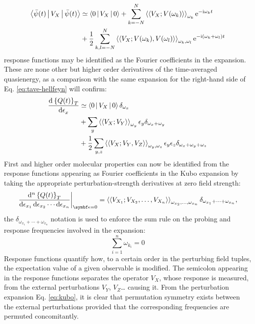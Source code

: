 \begin{equation}
\begin{aligned}
 \Braket{\bar{\psi}(t) | V_X | \bar{\psi}(t)} &\simeq
 \Braket{0|V_X|0} +\sum_{k=-N}^N
 \Braket{\Braket{V_X; V(\omega_k)}}_{\omega_k}\mathrm{e}^{-\mathrm{i}\omega_k t} \\
 &+\frac{1}{2}\sum_{k,l=-N}^N
 \Braket{\Braket{V_X; V(\omega_k),V(\omega_l)}}_{\omega_k,\omega_l}\mathrm{e}^{-\mathrm{i}(\omega_k+\omega_l)t}
\end{aligned}
\end{equation}
response functions may be identified as the Fourier coefficients in the
expansion. These are none other but higher order derivatives of the
time-averaged quasienergy, as a comparison with the same expansion for
the right-hand side of Eq. \eqref{eq:tave-hellfeyn} will confirm:
\begin{equation}\label{eq:kubo}
\begin{aligned}
  \frac{\mathop{}\!\mathrm{d}^{}\left\lbrace Q(t)\right\rbrace_T}{\mathop{}\!\mathrm{d} \epsilon_x^{}}
  &\simeq \Braket{0|V_X|0}\delta_{\omega_x} \\
  &+\sum_{y}\Braket{\Braket{V_X; V_Y}}_{\omega_y}\epsilon_y\delta_{\omega_x+\omega_y} \\
  &+\frac{1}{2}\sum_{y,z}\Braket{\Braket{V_X; V_Y,V_Z}}_{\omega_y,\omega_z}\epsilon_y\epsilon_z\delta_{\omega_x+\omega_y+\omega_z}
\end{aligned}
\end{equation}
First and higher order molecular properties can now be identified from
the response functions appearing as Fourier coefficients in the Kubo
expansion by taking the appropriate perturbation-strength derivatives at
zero field strength:
\begin{equation}\label{eq:nth-order-derivative}
  \left.\frac{\diff^n \aveQ}{\diff\epsilon_{x_1}\diff\epsilon_{x_2}\cdots\diff\epsilon_{x_n}} \right|_{\vect{\epsilon}=0}
  =
  \response{V_{X_1}}{V_{X_2}, \ldots, V_{X_n}}{\omega_{x_2},\ldots,\omega_{x_n}}\delta_{\omega_{x_1}+\cdots+\omega_{x_n}},
\end{equation}
the $\delta_{\omega_{x_1}+\cdots+\omega_{x_n}}$ notation is used to
enforce the sum rule on the probing and response frequencies involved in
the expansion:
\begin{equation}\label{eq:sum-rule}
 \sum_{i=1}^{n} \omega_{k_i} = 0
\end{equation}
Response functions quantify how, to a certain order in the perturbing
field tuples, the expectation value of a given observable is modified.
The semicolon appearing in the response functions separates the operator
$V_X$, whose response is measured, from the external perturbations
$V_Y$, $V_Z$\dots{} causing it.
From the perturbation expansion Eq. \eqref{eq:kubo}, it is clear that
permutation symmetry exists between the external perturbations provided
that the corresponding frequencies are permuted concomitantly.

